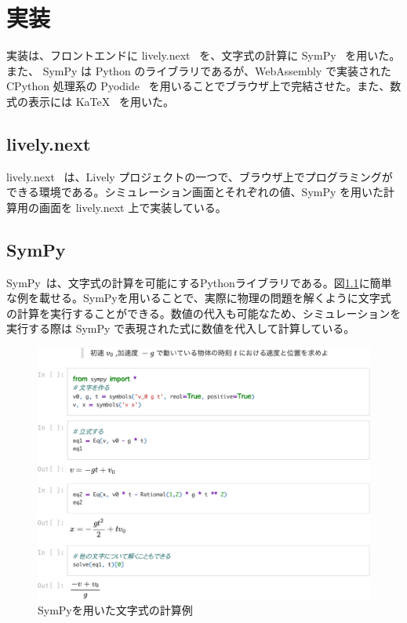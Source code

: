 \chapter{実装} \label{implementation}

実装は、フロントエンドに lively.next~\cite{lively.next} を、文字式の計算に SymPy~\cite{SymPy} を用いた。また、 SymPy は Python のライブラリであるが、WebAssembly で実装された CPython 処理系の Pyodide~\cite{Pyodide} を用いることでブラウザ上で完結させた。また、数式の表示には KaTeX~\cite{KaTeX} を用いた。

\section{lively.next}
lively.next~\cite{lively.next} は、Lively プロジェクト\cite{lively}の一つで、ブラウザ上でプログラミングができる環境である。シミュレーション画面とそれぞれの値、SymPy を用いた計算用の画面を lively.next 上で実装している。

\section{SymPy}
SymPy~\cite{SymPy}は、文字式の計算を可能にするPythonライブラリである。図\ref{SymPy_example}に簡単な例を載せる。SymPyを用いることで、実際に物理の問題を解くように文字式の計算を実行することができる。数値の代入も可能なため、シミュレーションを実行する際は SymPy で表現された式に数値を代入して計算している。

\clearpage
\begin{figure}
\includegraphics[page=1, scale=.8]{work/SymPy_example-crop.pdf}
\caption{SymPyを用いた文字式の計算例} \label{SymPy_example}
\end{figure}
\clearpage

